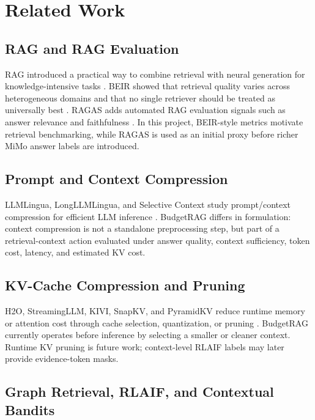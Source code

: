 \section{Related Work}

\subsection{RAG and RAG Evaluation}

RAG introduced a practical way to combine retrieval with neural generation for knowledge-intensive tasks \cite{lewis2020rag}. BEIR showed that retrieval quality varies across heterogeneous domains and that no single retriever should be treated as universally best \cite{thakur2021beir}. RAGAS adds automated RAG evaluation signals such as answer relevance and faithfulness \cite{es2023ragas}. In this project, BEIR-style metrics motivate retrieval benchmarking, while RAGAS is used as an initial proxy before richer MiMo answer labels are introduced.

\subsection{Prompt and Context Compression}

LLMLingua, LongLLMLingua, and Selective Context study prompt/context compression for efficient LLM inference \cite{jiang2023llmlingua,jiang2023longllmlingua,li2023selectivecontext}. BudgetRAG differs in formulation: context compression is not a standalone preprocessing step, but part of a retrieval-context action evaluated under answer quality, context sufficiency, token cost, latency, and estimated KV cost.

\subsection{KV-Cache Compression and Pruning}

H2O, StreamingLLM, KIVI, SnapKV, and PyramidKV reduce runtime memory or attention cost through cache selection, quantization, or pruning \cite{zhang2023h2o,xiao2023streamingllm,liu2024kivi,li2024snapkv,cai2024pyramidkv}. BudgetRAG currently operates before inference by selecting a smaller or cleaner context. Runtime KV pruning is future work; context-level RLAIF labels may later provide evidence-token masks.

\subsection{Graph Retrieval, RLAIF, and Contextual Bandits}

